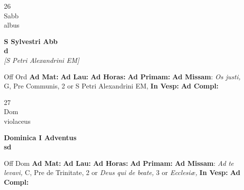 \documentclass[10pt, openany]{book}
\begin{document}
        \begin{center}
            \begin{minipage}{3.5in}
                \vspace{2em}
                \begin{minipage}{0.5in}
                    {\Huge 26} \\
                    {\normalsize Sabb} \\
                    {\normalsize albus}
                \end{minipage}
                \begin{minipage}{3.0in}
                    \textbf{ \large S Sylvestri Abb \\
                    \textnormal{\normalsize d}} \\ \textit{[S Petri Alexandrini EM]} \\ 
                \end{minipage}
                \begin{justify}Off Ord
                    \textbf{Ad Mat: }
                    \textbf{Ad Lau: }
                    \textbf{Ad Horas: }
                    \textbf{Ad Primam: }\textbf{Ad Missam}: \textit{Os justi,} G, Pre Communis, 2 or S Petri Alexandrini EM,  
                    \textbf{In Vesp: }
                    \textbf{Ad Compl: }
                \end{justify}
            \end{minipage}
        \end{center}
    
        \begin{center}
            \begin{minipage}{3.5in}
                \vspace{2em}
                \begin{minipage}{0.5in}
                    {\Huge 27} \\
                    {\normalsize Dom} \\
                    {\normalsize violaceus}
                \end{minipage}
                \begin{minipage}{3.0in}
                    \textbf{ \large Dominica I Adventus \\
                    \textnormal{\normalsize sd}} \\ 
                \end{minipage}
                \begin{justify}Off Dom
                    \textbf{Ad Mat: }
                    \textbf{Ad Lau: }
                    \textbf{Ad Horas: }
                    \textbf{Ad Primam: }\textbf{Ad Missam}: \textit{Ad te levavi,} C, Pre de Trinitate, 2 or \textit{Deus qui de beate,} 3 or \textit{Ecclesiæ,}  
                    \textbf{In Vesp: }
                    \textbf{Ad Compl: }
                \end{justify}
            \end{minipage}
        \end{center}
    
\end{document}
